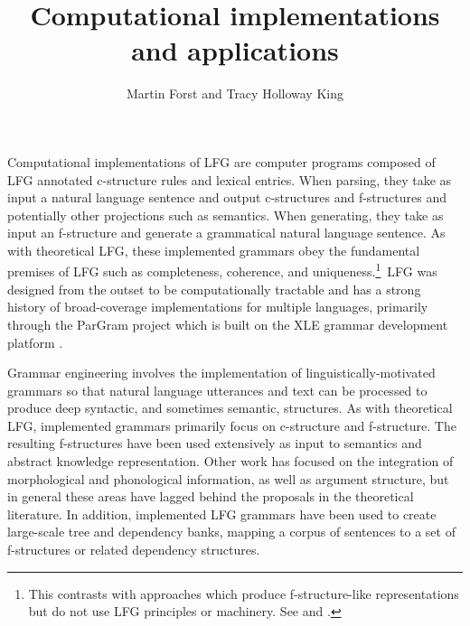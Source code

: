 \documentclass[output=paper,hidelinks]{langscibook}
\title{Computational implementations and applications}
\author{Martin Forst\affiliation{Cerence Inc.} and  Tracy Holloway King\affiliation{Adobe Inc.}}
\begin{document}
\maketitle
\label{chap:ImplementationsApplications}

Computational implementations of LFG are computer programs composed of LFG annotated c-structure rules and lexical entries. When parsing, they take as input  a natural language sentence and output c-structures and f-structures and potentially other projections such as semantics. When generating, they take as input an f-structure and generate a grammatical natural language sentence. As with theoretical LFG, these implemented grammars obey the fundamental premises of LFG such as completeness, coherence, and uniqueness.\footnote{This contrasts with approaches which produce f-structure-like representations but do not use LFG principles or machinery. See  and \cite{cahilletal02}.}\ LFG was designed from the outset to be computationally tractable and has a strong history of broad-coverage implementations for multiple languages, primarily through the ParGram project \citep{ButtEtAl1999} which is built on the XLE grammar development platform \citep{xledoc}. 

\hspace*{-.5pt}Grammar engineering involves the implementation of linguistically-motivated grammars so that natural language utterances and text can be processed to produce deep syntactic, and sometimes semantic, structures. As with theoretical LFG, implemented grammars primarily focus on c-struc\-ture and f-structure. The resulting f-structures have been used extensively as input to semantics and abstract knowledge representation. Other work has focused on the integration of morphological and phonological information, as well as argument structure, but in general these areas have lagged behind the proposals in the theoretical literature. In addition, implemented LFG grammars have been used to create large-scale tree and dependency banks, mapping a corpus of sentences to a set of f-structures or related dependency structures.

\end{document}
